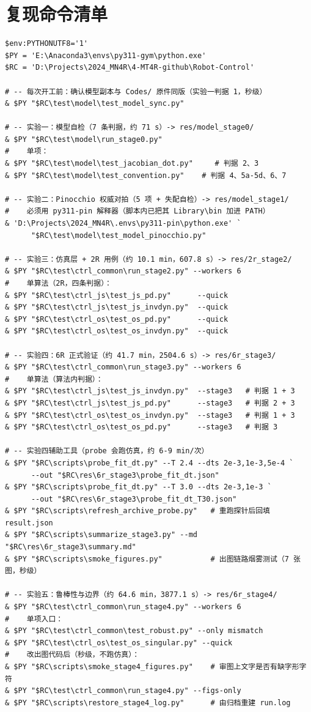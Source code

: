 \documentclass[11pt,a4paper]{ctexart}
\begin{document}
\section{复现命令清单}\label{app:commands}

{\footnotesize
\begin{verbatim}
$env:PYTHONUTF8='1'
$PY = 'E:\Anaconda3\envs\py311-gym\python.exe'
$RC = 'D:\Projects\2024_MN4R\4-MT4R-github\Robot-Control'

# -- 每次开工前：确认模型副本与 Codes/ 原件同版（实验一判据 1，秒级）
& $PY "$RC\test\model\test_model_sync.py"

# -- 实验一：模型自检（7 条判据，约 71 s）-> res/model_stage0/
& $PY "$RC\test\model\run_stage0.py"
#    单项：
& $PY "$RC\test\model\test_jacobian_dot.py"     # 判据 2、3
& $PY "$RC\test\model\test_convention.py"    # 判据 4、5a-5d、6、7

# -- 实验二：Pinocchio 权威对拍（5 项 + 失配自检）-> res/model_stage1/
#    必须用 py311-pin 解释器（脚本内已把其 Library\bin 加进 PATH）
& 'D:\Projects\2024_MN4R\.envs\py311-pin\python.exe' `
      "$RC\test\model\test_model_pinocchio.py"

# -- 实验三：仿真层 + 2R 用例（约 10.1 min，607.8 s）-> res/2r_stage2/
& $PY "$RC\test\ctrl_common\run_stage2.py" --workers 6
#    单算法（2R，四条判据）：
& $PY "$RC\test\ctrl_js\test_js_pd.py"      --quick
& $PY "$RC\test\ctrl_js\test_js_invdyn.py"  --quick
& $PY "$RC\test\ctrl_os\test_os_pd.py"      --quick
& $PY "$RC\test\ctrl_os\test_os_invdyn.py"  --quick

# -- 实验四：6R 正式验证（约 41.7 min，2504.6 s）-> res/6r_stage3/
& $PY "$RC\test\ctrl_common\run_stage3.py" --workers 6
#    单算法（算法内判据）：
& $PY "$RC\test\ctrl_js\test_js_invdyn.py"  --stage3   # 判据 1 + 3
& $PY "$RC\test\ctrl_js\test_js_pd.py"      --stage3   # 判据 2 + 3
& $PY "$RC\test\ctrl_os\test_os_invdyn.py"  --stage3   # 判据 1 + 3
& $PY "$RC\test\ctrl_os\test_os_pd.py"      --stage3   # 判据 3

# -- 实验四辅助工具（probe 会跑仿真，约 6-9 min/次）
& $PY "$RC\scripts\probe_fit_dt.py" --T 2.4 --dts 2e-3,1e-3,5e-4 `
      --out "$RC\res\6r_stage3\probe_fit_dt.json"
& $PY "$RC\scripts\probe_fit_dt.py" --T 3.0 --dts 2e-3,1e-3 `
      --out "$RC\res\6r_stage3\probe_fit_dt_T30.json"
& $PY "$RC\scripts\refresh_archive_probe.py"   # 重跑探针后回填 result.json
& $PY "$RC\scripts\summarize_stage3.py" --md "$RC\res\6r_stage3\summary.md"
& $PY "$RC\scripts\smoke_figures.py"           # 出图链路烟雾测试（7 张图，秒级）

# -- 实验五：鲁棒性与边界（约 64.6 min，3877.1 s）-> res/6r_stage4/
& $PY "$RC\test\ctrl_common\run_stage4.py" --workers 6
#    单项入口：
& $PY "$RC\test\ctrl_common\test_robust.py" --only mismatch
& $PY "$RC\test\ctrl_os\test_os_singular.py" --quick
#    改出图代码后（秒级，不跑仿真）：
& $PY "$RC\scripts\smoke_stage4_figures.py"    # 审图上文字是否有缺字形字符
& $PY "$RC\test\ctrl_common\run_stage4.py" --figs-only
& $PY "$RC\scripts\restore_stage4_log.py"      # 由归档重建 run.log
\end{verbatim}
}
\end{document}
